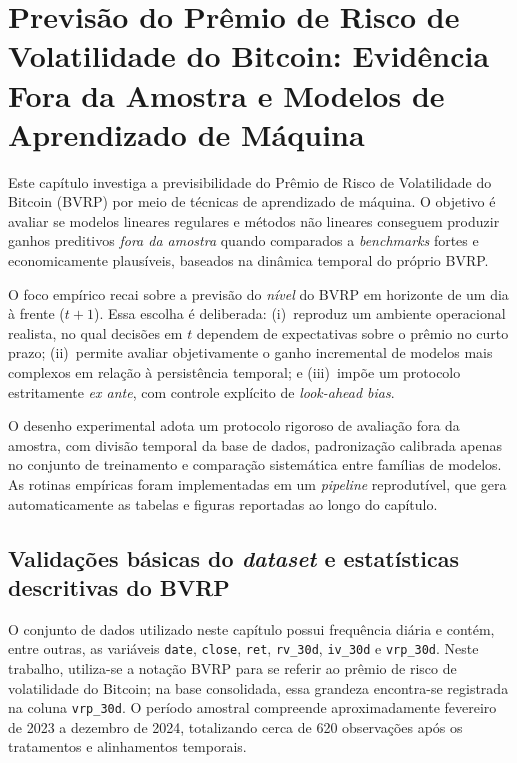 \chapter{Previsão do Prêmio de Risco de Volatilidade do Bitcoin: Evidência Fora da Amostra e Modelos de Aprendizado de Máquina}
\label{chap:cap6_ml}

Este capítulo investiga a previsibilidade do Prêmio de Risco de Volatilidade do
Bitcoin (BVRP) por meio de técnicas de aprendizado de máquina. O objetivo é
avaliar se modelos lineares regulares e métodos não lineares conseguem produzir
ganhos preditivos \textit{fora da amostra} quando comparados a \textit{benchmarks}
fortes e economicamente plausíveis, baseados na dinâmica temporal do próprio BVRP.

O foco empírico recai sobre a previsão do \textit{nível} do BVRP em horizonte de
um dia à frente ($t+1$). Essa escolha é deliberada: (i)~reproduz um ambiente
operacional realista, no qual decisões em $t$ dependem de expectativas sobre o
prêmio no curto prazo; (ii)~permite avaliar objetivamente o ganho incremental de
modelos mais complexos em relação à persistência temporal; e (iii)~impõe um
protocolo estritamente \textit{ex ante}, com controle explícito de
\textit{look-ahead bias}.

O desenho experimental adota um protocolo rigoroso de avaliação fora da amostra,
com divisão temporal da base de dados, padronização calibrada apenas no conjunto
de treinamento e comparação sistemática entre famílias de modelos. As rotinas
empíricas foram implementadas em um \textit{pipeline} reprodutível, que gera
automaticamente as tabelas e figuras reportadas ao longo do capítulo.

\section{Validações básicas do \textit{dataset} e estatísticas descritivas do BVRP}
\label{sec:cap6_dataset_checks}

O conjunto de dados utilizado neste capítulo possui frequência diária e contém,
entre outras, as variáveis \texttt{date}, \texttt{close}, \texttt{ret},
\texttt{rv\_30d}, \texttt{iv\_30d} e \texttt{vrp\_30d}. Neste trabalho, utiliza-se
a notação BVRP para se referir ao prêmio de risco de volatilidade do Bitcoin; na
base consolidada, essa grandeza encontra-se registrada na coluna \texttt{vrp\_30d}.
O período amostral compreende aproximadamente fevereiro de 2023 a dezembro de 2024,
totalizando cerca de 620 observações após os tratamentos e alinhamentos temporais.

